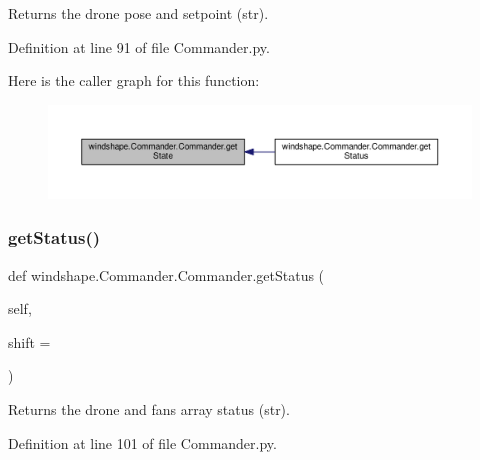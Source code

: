 \begin{DoxyVerb}Returns the drone pose and setpoint (str).\end{DoxyVerb}
 

Definition at line 91 of file Commander.\+py.

Here is the caller graph for this function\+:\nopagebreak
\begin{figure}[H]
\begin{center}
\leavevmode
\includegraphics[width=350pt]{classwindshape_1_1_commander_1_1_commander_acb51776e8a0d70e32f93988565b78c40_icgraph}
\end{center}
\end{figure}
\mbox{\label{classwindshape_1_1_commander_1_1_commander_ac5457a24e8bf37f5e89aa16e6b210c9e}} 
\subsubsection{\texorpdfstring{get\+Status()}{getStatus()}}
{\footnotesize\ttfamily def windshape.\+Commander.\+Commander.\+get\+Status (\begin{DoxyParamCaption}\item[{}]{self,  }\item[{}]{shift = {} }\end{DoxyParamCaption})}

\begin{DoxyVerb}Returns the drone and fans array status (str).\end{DoxyVerb}
 

Definition at line 101 of file Commander.\+py.

